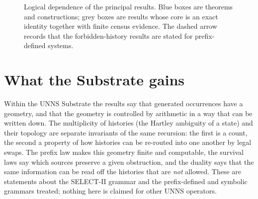\begin{figure}[ht]\centering
{}
\caption{Logical dependence of the principal results. Blue boxes are theorems and constructions; grey boxes are results whose core is an exact identity together with finite census evidence. The dashed arrow records that the forbidden-history results are stated for prefix-defined systems.}\label{fig:dependence}
\end{figure}

\section{What the Substrate gains}\label{sec:implications}
Within the UNNS Substrate the results say that generated occurrences have a geometry, and that the geometry is controlled by arithmetic in a way that can be written down. The multiplicity of histories (the Hartley ambiguity of a state) and their topology are separate invariants of the same recursion: the first is a count, the second a property of how histories can be re-routed into one another by legal swaps. The prefix law makes this geometry finite and computable, the survival laws say which sources preserve a given obstruction, and the duality says that the same information can be read off the histories that are \emph{not} allowed. These are statements about the SELECT-II grammar and the prefix-defined and symbolic grammars treated; nothing here is claimed for other UNNS operators.

